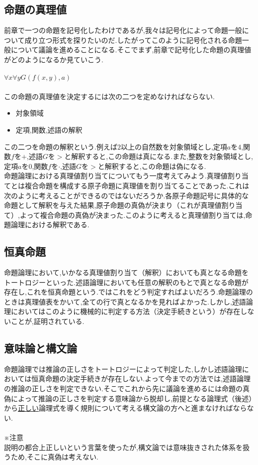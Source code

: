 \documentclass[10pt,b5paper,papersize,dvipdfmx]{jsbook}
\begin{document}
\subsection{命題の真理値}
前章で一つの命題を記号化したわけであるが,我々は記号化によって命題一般について成り立つ形式を探りたいのだ.したがってこのように記号化される命題一般について議論を進めることになる.そこでまず,前章で記号化した命題の真理値がどのようになるか見ていこう. \\
\\
$\forall x\forall yG(f(x,y),a)$ \\
\\
この命題の真理値を決定するには次の二つを定めなければならない.
\begin{itemize}
\item 対象領域
\item 定項,関数,述語の解釈
\end{itemize}
この二つを命題の解釈という.例えば$2$以上の自然数を対象領域とし,定項$a$を$4$,関数$f$を$+$,述語$G$を$>$と解釈すると,この命題は真になる.また,整数を対象領域とし,定項$a$を$0$,関数$f$を$\cdot$,述語$G$を$>$と解釈すると,この命題は偽になる. \\
命題論理における真理値割り当てについてもう一度考えてみよう.真理値割り当てとは複合命題を構成する原子命題に真理値を割り当てることであった.これは次のように考えることができるのではないだろうか.各原子命題記号に具体的な命題として解釈を与えた結果,原子命題の真偽が決まり（これが真理値割り当て）,よって複合命題の真偽が決まった.このように考えると真理値割り当ては,命題論理における解釈である.

\subsection{恒真命題}
命題論理において,いかなる真理値割り当て（解釈）においても真となる命題をトートロジーといった.述語論理においても任意の解釈のもとで真となる命題が存在し,これを恒真命題という.ではこれをどう判定すればよいだろう.命題論理のときは真理値表をかいて,全ての行で真となるかを見ればよかった.しかし,述語論理においてはこのように機械的に判定する方法（決定手続きという）が存在しないことが,証明されている.

\subsection{意味論と構文論}
命題論理では推論の正しさをトートロジーによって判定した,しかし述語論理においては恒真命題の決定手続きが存在しない.よって今までの方法では,述語論理の推論の正しさを判定できない.そこでこれから先に議論を進めるには命題の真偽によって推論の正しさを判定する意味論から脱却し,前提となる論理式（後述）から\underline{正しい}論理式を導く規則について考える構文論の方へと進まなければならない.\\
\\
※注意 \\
説明の都合上正しいという言葉を使ったが,構文論では意味抜きされた体系を扱うため,そこに真偽は考えない.
\end{document}
